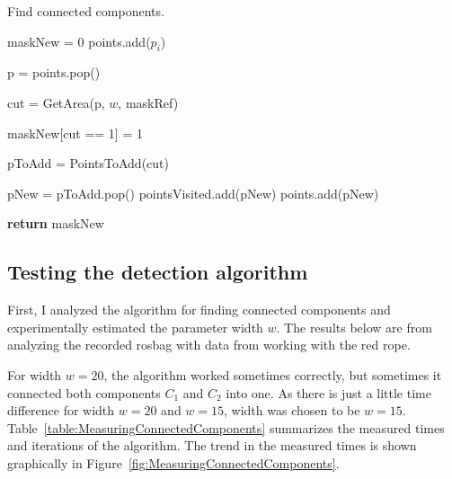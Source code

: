             \begin{algorithm}
                \caption{Find connected components.}\label{alg:ConnectedComponents}
                \begin{algorithmic}[1]


                \State maskNew = 0 
                \State points.add($p_i$) 

                    \State p = points.pop()

                    \State cut = GetArea(p, $w$, maskRef) 

                    \State maskNew[cut == 1] = 1 

                    \State pToAdd = PointsToAdd(cut) 

                        pNew = pToAdd.pop()
                         
                            \State pointsVisited.add(pNew)
                            \State points.add(pNew)
                        \EndIf
                    \EndWhile

                \EndWhile

                \State \textbf{return} maskNew

                \EndProcedure
                \end{algorithmic}
            \end{algorithm}

        \subsection{Testing the detection algorithm}

            First, I analyzed the algorithm for finding connected components and experimentally estimated the parameter width $w$. The results below are from analyzing the recorded rosbag with data from working with the red rope.

            For width $w = 20$, the algorithm worked sometimes correctly, but sometimes it connected both components $C_1$ and $C_2$ into one. As there is just a little time difference for width $w=20$ and $w=15$, width was chosen to be $w=15$. Table~\ref{table:MeasuringConnectedComponents} summarizes the measured times and iterations of the algorithm. The trend in the measured times is shown graphically in Figure~\ref{fig:MeasuringConnectedComponents}.

